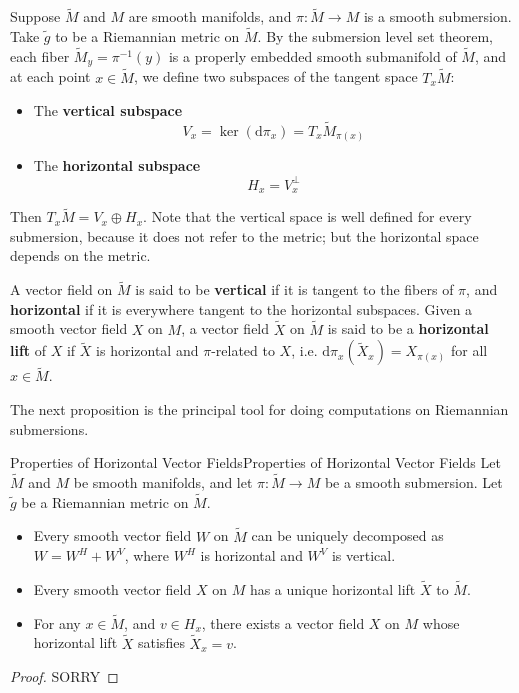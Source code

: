 \documentclass[../main.tex]{subfiles}
\begin{document}
Suppose $\tilde{M}$ and $M$ are smooth manifolds, and $\pi: \tilde{M} \to M$ is a smooth submersion. Take $\tilde{g}$ to be a Riemannian metric on $\tilde{M}$. By the submersion level set theorem, each fiber $\tilde{M}_y = \pi^{-1}(y)$ is a properly embedded smooth submanifold of $\tilde{M}$, and at each point $x \in \tilde{M}$, we define two subspaces of the tangent space $T_x\tilde{M}$:
\begin{itemize}
	\item The \textbf{vertical subspace}
	      \begin{equation}
		      V_x = \ker(\mathrm{d}\pi_x) = T_x\tilde{M}_{\pi(x)}
	      \end{equation}
	\item The \textbf{horizontal subspace}
	      \begin{equation}
		      H_x = V_x^\perp
	      \end{equation}
\end{itemize}
Then $T_x\tilde{M} = V_x \oplus H_x$. Note that the vertical space is well defined for every submersion, because it does not refer to the metric; but the horizontal space depends on the metric.

A vector field on $\tilde{M}$ is said to be \textbf{vertical} if it is tangent to the fibers of $\pi$, and \textbf{horizontal} if it is everywhere tangent to the horizontal subspaces. Given a smooth vector field $X$ on $M$, a vector field $\tilde{X}$ on $\tilde{M}$ is said to be a \textbf{horizontal lift} of $X$ if $\tilde{X}$ is horizontal and $\pi$-related to $X$, i.e. $\mathrm{d}\pi_x(\tilde{X}_x) = X_{\pi(x)}$ for all $x \in \tilde{M}$.

The next proposition is the principal tool for doing computations on Riemannian submersions.

\begin{proposition}{Properties of Horizontal Vector Fields}{Properties of Horizontal Vector Fields}
	Let $\tilde{M}$ and $M$ be smooth manifolds, and let $\pi: \tilde{M} \to M$ be a smooth submersion. Let $\tilde{g}$ be a Riemannian metric on $\tilde{M}$.
	\begin{itemize}
		\item Every smooth vector field $W$ on $\tilde{M}$ can be uniquely decomposed as $W = W^H + W^V$, where $W^H$ is horizontal and $W^V$ is vertical.
		\item Every smooth vector field $X$ on $M$ has a unique horizontal lift $\tilde{X}$ to $\tilde{M}$.
		\item For any $x \in \tilde{M}$, and $v \in H_x$, there exists a vector field $X$ on $M$ whose horizontal lift $\tilde{X}$ satisfies $\tilde{X}_x = v$.
	\end{itemize}
\end{proposition}
\begin{proof}
	SORRY
\end{proof}
\end{document}
